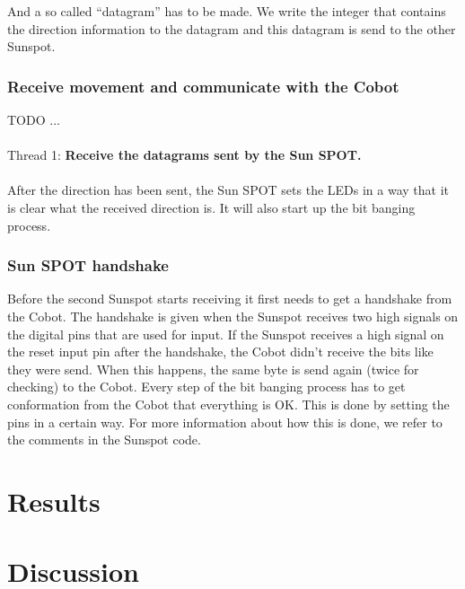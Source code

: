 \documentclass[a4paper,10pt]{article} %
\begin{document}
And a so called ``datagram'' has to be made. We write the integer that contains
the direction information to the datagram and this datagram is send to the other
Sunspot.


\subsubsection{Receive movement and communicate with the Cobot} %
TODO ...
\\
\\
\noindent Thread 1: \textbf{Receive the datagrams sent by the Sun SPOT.}
\\
\\
After the direction has been sent, the Sun SPOT sets the LEDs in a way that
it is clear what the received direction is. It will also start up the bit
banging process.


\subsubsection{Sun SPOT handshake} %
\label{subsub:Sun SPOT handshake}

Before the second Sunspot starts receiving it first needs to get a handshake
from the Cobot. The handshake is given when the Sunspot receives two high
signals on the digital pins that are used for input. If the Sunspot receives a
high signal on the reset input pin after the handshake, the Cobot didn't
receive the bits like they were send. When this happens, the same byte is send
again (twice for checking) to the Cobot. Every step of the bit banging process
has to get conformation from the Cobot that everything is OK. This is done by
setting the pins in a certain way. For more information about how this is done,
we refer to the comments in the Sunspot code.




\section{Results} %
\label{sec:Results}


\section{Discussion} %
\end{document}
